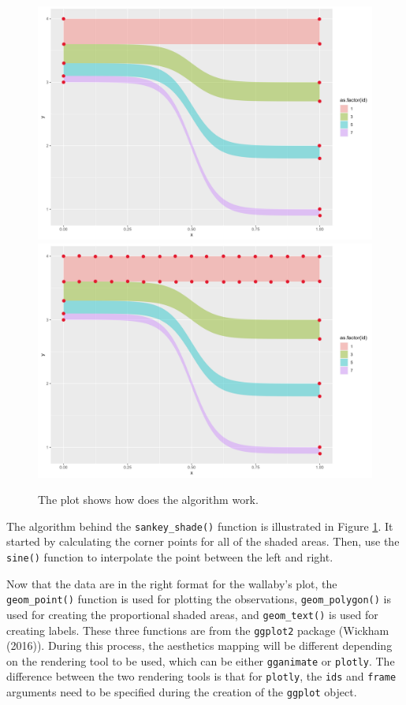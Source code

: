 \begin{figure}
\includegraphics[width=0.5\linewidth]{figures/sankey-shade-1} \includegraphics[width=0.5\linewidth]{figures/sankey-shade-2} \caption{The plot shows how does the algorithm work.}\label{fig:shade-algorithm}
\end{figure}

The algorithm behind the \texttt{sankey\_shade()} function is illustrated in Figure \ref{fig:shade-algorithm}. It started by calculating the corner points for all of the shaded areas. Then, use the \texttt{sine()} function to interpolate the point between the left and right.

Now that the data are in the right format for the wallaby's plot, the \texttt{geom\_point()} function is used for plotting the observations, \texttt{geom\_polygon()} is used for creating the proportional shaded areas, and \texttt{geom\_text()} is used for creating labels. These three functions are from the \texttt{ggplot2} package (Wickham (2016)). During this process, the aesthetics mapping will be different depending on the rendering tool to be used, which can be either \texttt{gganimate} or \texttt{plotly}. The difference between the two rendering tools is that for \texttt{plotly}, the \texttt{ids} and \texttt{frame} arguments need to be specified during the creation of the \texttt{ggplot} object.

